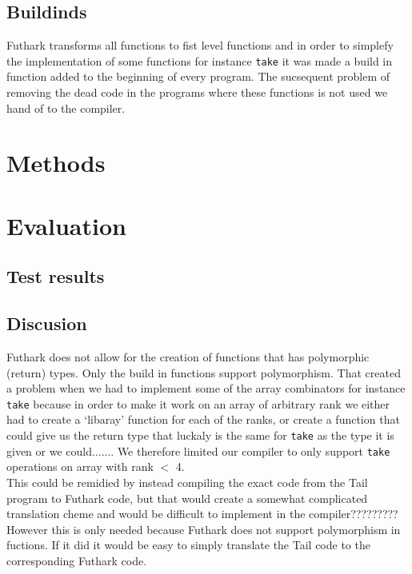 \documentclass[11pt]{article}
\begin{document}
\subsection{Buildinds}
Futhark transforms all functions to fist level functions and in order to simplefy the implementation of some functions for instance \verb|take| it was made a build in function added to the beginning of every program. The sucsequent problem of removing the dead code in the programs where these functions is not used we hand of to the compiler.



\section{Methods}
\section{Evaluation}
\subsection{Test results}
\subsection{Discusion}
Futhark does not allow for the creation of functions that has polymorphic (return) types. Only the build in functions support polymorphism. That created a problem when we had to implement some of the array combinators for instance  \verb|take| because in order to make it work on an array of arbitrary rank we either had to create a `libaray' function for each of the ranks, or create a function that could give us the return type that luckaly is the same for \verb|take| as the type it is given or we could....... 
We therefore limited our compiler to only support \verb|take| operations on array with rank \(< \) 4. \\ %

This could be remidied by instead compiling the exact code from the Tail program to Futhark code, but that would create a somewhat complicated translation cheme and would be difficult to implement in the compiler????????? %
However this is only needed because Futhark does not support polymorphism in fuctions. If it did it would be easy to simply translate the Tail code to the corresponding Futhark code.
\end{document}
